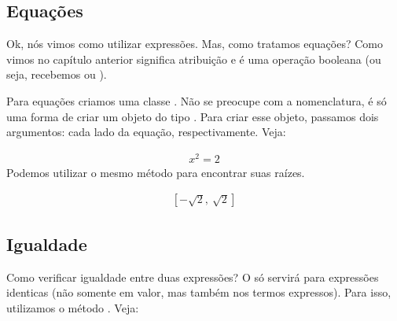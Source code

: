 \documentclass[letterpaper,10pt,english]{jupyterBook}
\begin{document}
\subsection{Equações}
\label{\detokenize{chapters/3:equacoes}}
\sphinxAtStartPar
Ok, nós vimos como utilizar expressões. Mas, como tratamos equações? Como vimos no capítulo anterior \sphinxcode{\sphinxupquote{=}} significa atribuição e \sphinxcode{\sphinxupquote{==}} é uma operação booleana (ou seja, recebemos  ou ).

\sphinxAtStartPar
Para equações criamos uma classe . Não se preocupe com a nomenclatura, é só uma forma de criar um objeto do tipo . Para criar esse objeto, passamos dois argumentos: cada lado da equação, respectivamente. Veja:

\begin{sphinxVerbatim}[commandchars=\\\{\}]
   
\end{sphinxVerbatim}
\begin{equation*}
\begin{split}\displaystyle x^{2} = 2\end{split}
\end{equation*}
\sphinxAtStartPar
Podemos utilizar o mesmo método para encontrar suas raízes.

\begin{sphinxVerbatim}[commandchars=\\\{\}]
\end{sphinxVerbatim}
\begin{equation*}
\begin{split}\displaystyle \left[ - \sqrt{2}, \  \sqrt{2}\right]\end{split}
\end{equation*}

\subsection{Igualdade}
\label{\detokenize{chapters/3:igualdade}}
\sphinxAtStartPar
Como verificar igualdade entre duas expressões? O \sphinxcode{\sphinxupquote{==}} só servirá para expressões identicas (não somente em valor, mas também nos termos expressos). Para isso, utilizamos o método . Veja:
\end{document}
